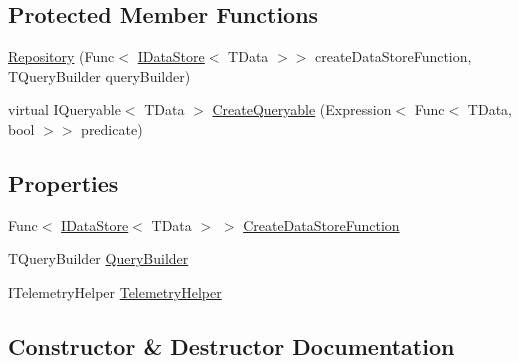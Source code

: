\subsection*{Protected Member Functions}
\begin{DoxyCompactItemize}
\item 
\hyperlink{classCqrs_1_1Repositories_1_1Repository_a2f4009847fa03a897c6698fd5a92d89f_a2f4009847fa03a897c6698fd5a92d89f}{Repository} (Func$<$ \hyperlink{interfaceCqrs_1_1DataStores_1_1IDataStore}{I\+Data\+Store}$<$ T\+Data $>$$>$ create\+Data\+Store\+Function, T\+Query\+Builder query\+Builder)
\item 
virtual I\+Queryable$<$ T\+Data $>$ \hyperlink{classCqrs_1_1Repositories_1_1Repository_ab95fc66b24e8359a1e2f48a3ca2f14c1_ab95fc66b24e8359a1e2f48a3ca2f14c1}{Create\+Queryable} (Expression$<$ Func$<$ T\+Data, bool $>$$>$ predicate)
\end{DoxyCompactItemize}
\subsection*{Properties}
\begin{DoxyCompactItemize}
\item 
Func$<$ \hyperlink{interfaceCqrs_1_1DataStores_1_1IDataStore}{I\+Data\+Store}$<$ T\+Data $>$ $>$ \hyperlink{classCqrs_1_1Repositories_1_1Repository_ae15cee6394a223564ad2ead65cd30189_ae15cee6394a223564ad2ead65cd30189}{Create\+Data\+Store\+Function}
\item 
T\+Query\+Builder \hyperlink{classCqrs_1_1Repositories_1_1Repository_a4447451b7dbcfcd68dfa3fa65a41f357_a4447451b7dbcfcd68dfa3fa65a41f357}{Query\+Builder}
\item 
I\+Telemetry\+Helper \hyperlink{classCqrs_1_1Repositories_1_1Repository_aae263dc1dda61f89c011be6d578620bd_aae263dc1dda61f89c011be6d578620bd}{Telemetry\+Helper}
\end{DoxyCompactItemize}


\subsection{Constructor \& Destructor Documentation}
\mbox{\label{classCqrs_1_1Repositories_1_1Repository_a2f4009847fa03a897c6698fd5a92d89f_a2f4009847fa03a897c6698fd5a92d89f}} 
